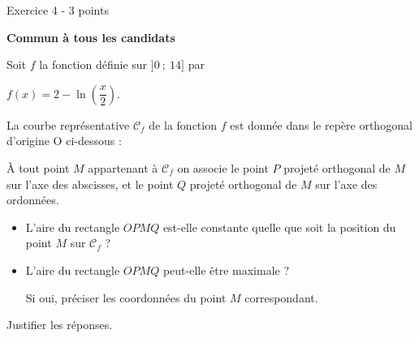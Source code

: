 
%
\begin{h2}Exercice 4 -  3 points\end{h2}
\textbf{Commun  à tous les candidats}
\par
Soit $f$ la fonction définie sur $]0~;~14]$ par
\begin{center}$f(x) = 2-\ln\left(\dfrac{x}{2}\right).$\end{center}
La courbe représentative $\mathscr{C}_f$ de la fonction $f$ est donnée dans le repère orthogonal d'origine O ci-dessous :

\begin{center}
\end{center}
À tout point $M$ appartenant à $\mathscr{C}_f$ on associe le point $P$ projeté orthogonal de $M$ sur l'axe des abscisses, et le point $Q$ projeté orthogonal de $M$ sur l'axe des ordonnées.
\begin{itemize}
     \item
     L'aire du rectangle $OPMQ$ est-elle constante quelle que soit la position du point $M$ sur $\mathscr{C}_f$ ?
     \item
     L'aire du rectangle $OPMQ$ peut-elle être maximale ?
     \par
     Si oui, préciser les coordonnées du point $M$ correspondant.
\end{itemize}
Justifier les réponses.
